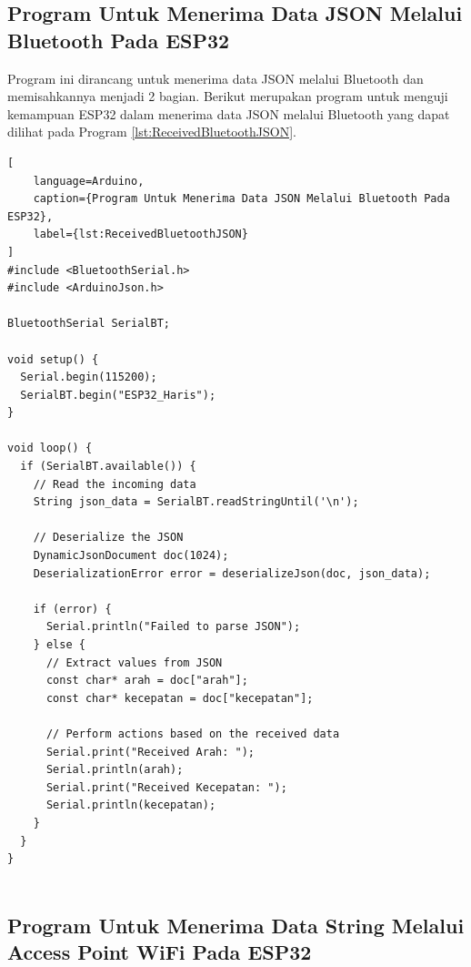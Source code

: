 \subsection{Program Untuk Menerima Data JSON Melalui Bluetooth Pada ESP32}

Program ini dirancang untuk menerima data JSON melalui Bluetooth dan memisahkannya menjadi 2 bagian. Berikut merupakan program untuk menguji kemampuan ESP32 dalam menerima data JSON melalui Bluetooth yang dapat dilihat pada Program \ref{lst:ReceivedBluetoothJSON}. 

\begin{lstlisting}[
    language=Arduino,
    caption={Program Untuk Menerima Data JSON Melalui Bluetooth Pada ESP32},
    label={lst:ReceivedBluetoothJSON}
]
#include <BluetoothSerial.h>
#include <ArduinoJson.h>

BluetoothSerial SerialBT;

void setup() {
  Serial.begin(115200);
  SerialBT.begin("ESP32_Haris");
}

void loop() {
  if (SerialBT.available()) {
    // Read the incoming data
    String json_data = SerialBT.readStringUntil('\n');

    // Deserialize the JSON
    DynamicJsonDocument doc(1024);
    DeserializationError error = deserializeJson(doc, json_data);

    if (error) {
      Serial.println("Failed to parse JSON");
    } else {
      // Extract values from JSON
      const char* arah = doc["arah"];
      const char* kecepatan = doc["kecepatan"];

      // Perform actions based on the received data
      Serial.print("Received Arah: ");
      Serial.println(arah);
      Serial.print("Received Kecepatan: ");
      Serial.println(kecepatan);
    }
  }
}
    
\end{lstlisting}

\subsection{Program Untuk Menerima Data String Melalui Access Point WiFi Pada ESP32}

